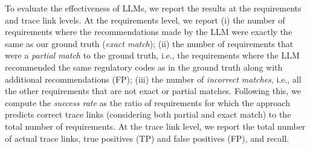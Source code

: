 
To evaluate the effectiveness of LLMs, we report the results at the requirements and trace link levels. At the requirements level, we report (i) the number of requirements where the recommendations made by the LLM were exactly the same as our ground truth (\emph{exact match}); (ii) the number of requirements that were a \emph{partial match} to the ground truth, i.e., the requirements where the LLM recommended the same regulatory codes as in the ground truth along with additional recommendations (FP); 
(iii) the number of \emph{incorrect matches}, i.e., all the other requirements that are not exact or partial matches. Following this, we compute the \textit{success rate}  as the ratio of requirements for which the approach predicts correct trace links (considering both partial and exact match) to the total number of requirements. At the trace link level, we report the total number of actual trace links, true positives (TP) and false positives (FP), and recall.

